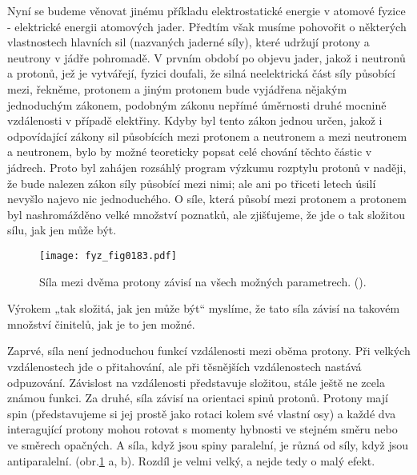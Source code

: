     Nyní se budeme věnovat jinému příkladu elektrostatické energie v atomové fyzice - elektrické
    energii atomových jader. Předtím však musíme pohovořit o některých vlastnostech hlavních sil
    (nazvaných jaderné síly), které udržují protony a neutrony v jádře pohromadě. V prvním období po
    objevu jader, jakož i neutronů a protonů, jež je vytvářejí, fyzici doufali, že silná
    neelektrická část síly působící mezi, řekněme, protonem a jiným protonem bude vyjádřena nějakým
    jednoduchým zákonem, podobným zákonu nepřímé úměrnosti druhé mocnině vzdálenosti v případě
    elektřiny. Kdyby byl tento zákon jednou určen, jakož i odpovídající zákony sil působících mezi
    protonem a neutronem a mezi neutronem a neutronem, bylo by možné teoreticky popsat celé chování
    těchto částic v jádrech. Proto byl zahájen rozsáhlý program výzkumu rozptylu protonů v naději,
    že bude nalezen zákon síly působící mezi nimi; ale ani po třiceti letech úsilí nevyšlo najevo
    nic jednoduchého. O síle, která působí mezi protonem a protonem byl nashromážděno velké množství
    poznatků, ale zjišťujeme, že jde o tak složitou sílu, jak jen může být.

    \begin{figure}[ht!]  %
      \centering
      \texttt{[image: fyz\_fig0183.pdf]}
      \caption{Síla mezi dvěma protony závisí na všech možných parametrech.
              (\cite[s.~148]{Feynman02}).}
      \label{fyz:fig0183}
    \end{figure}

    Výrokem „tak složitá, jak jen může být“ myslíme, že tato síla závisí na takovém množství
    činitelů, jak je to jen možné.
    
    Zaprvé, síla není jednoduchou funkcí vzdálenosti mezi oběma protony. Při velkých vzdálenostech
    jde o přitahování, ale při těsnějších vzdálenostech nastává odpuzování. Závislost na vzdálenosti
    představuje složitou, stále ještě ne zcela známou funkci. Za druhé, síla závisí na orientaci
    spinů protonů. Protony mají spin (představujeme si jej prostě jako rotaci kolem své vlastní osy)
    a každé dva interagující protony mohou rotovat s momenty hybnosti ve stejném směru nebo ve
    směrech opačných. A síla, když jsou spiny paralelní, je různá od síly, když jsou antiparalelní.
    (obr.\ref{fyz:fig0183} a, b). Rozdíl je velmi velký, a nejde tedy o malý efekt.

